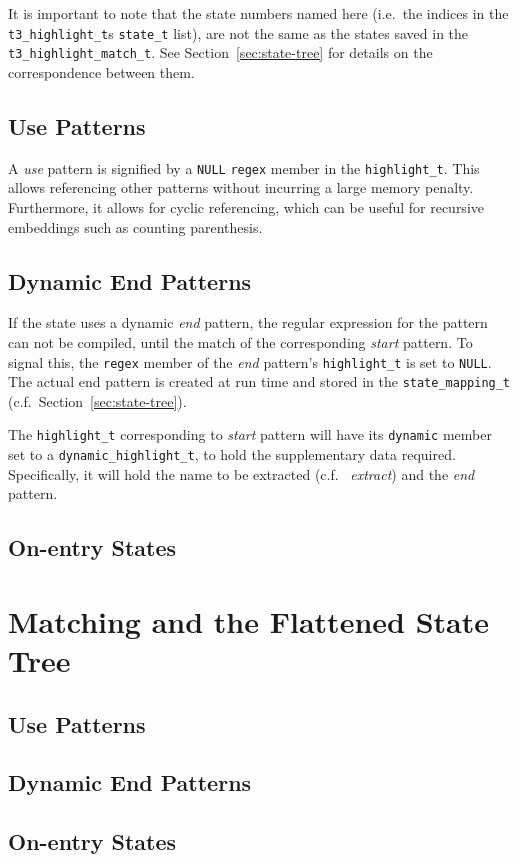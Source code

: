 \documentclass[a4paper,twocolumn]{article}
\newcommand{\state}{{\tt state_t}\xspace}
\newcommand{\highlight}{{\tt highlight_t}\xspace}
\begin{document}
It is important to note that the state numbers named here (i.e.\ the indices in
the {\tt t3_highlight_t}s \state list), are not the same as the states saved in
the {\tt t3_highlight_match_t}. See Section~\ref{sec:state-tree} for details on
the correspondence between them.


\subsection{Use Patterns}
A {\it use} pattern is signified by a {\tt NULL} {\tt regex} member in the
\highlight\footnotemark[1]. This allows referencing other patterns without
incurring a large memory penalty. Furthermore, it allows for cyclic
referencing, which can be useful for recursive embeddings such as counting
parenthesis.

\subsection{Dynamic End Patterns}
If the state uses a dynamic {\it end} pattern, the regular expression for the
pattern can not be compiled, until the match of the corresponding {\it start}
pattern. To signal this, the {\tt regex} member of the {\it end} pattern's \highlight is set
to {\tt NULL}\footnotemark[1]. The actual end pattern is created at run time
and stored in the {\tt state_mapping_t} (c.f.\ Section~\ref{sec:state-tree}).

The \highlight corresponding to {\it start} pattern will have its {\tt dynamic}
member set to a {\tt dynamic_highlight_t}, to hold the supplementary data
required. Specifically, it will hold the name to be extracted (c.f.\ {\it
extract}) and the {\it end} pattern.

\subsection{On-entry States}


\section{Matching and the Flattened State Tree\label{sec:state-tree}}

\subsection{Use Patterns}
\subsection{Dynamic End Patterns}
\subsection{On-entry States}
\end{document}
